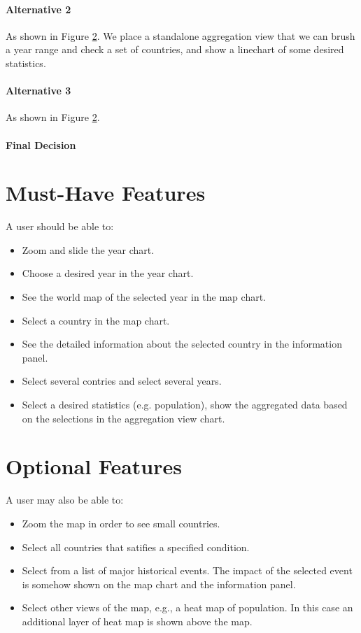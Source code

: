 \documentclass[12pt, fullpage,letterpaper]{article}
\begin{document}
\paragraph{Alternative 2}
As shown in Figure \ref{}.
We place a standalone aggregation view that we can brush a year range and check a set of countries, and
show a linechart of some desired statistics.

\paragraph{Alternative 3}
As shown in Figure \ref{}.

\paragraph{Final Decision}




\section{Must-Have Features}
A user should be able to:
\begin{itemize}
    \item Zoom and slide the year chart.
    \item Choose a desired year in the year chart. 
    \item See the world map of the selected year in the map chart.
    \item Select a country in the map chart.
    \item See the detailed information about the selected country in the information panel.
    \item Select several contries and select several years.
    \item Select a desired statistics (e.g. population), show the aggregated data based on the selections in the aggregation view chart.
\end{itemize}

\section{Optional Features}
A user may also be able to:
\begin{itemize}
    \item Zoom the map in order to see small countries.
    \item Select all countries that satifies a specified condition.
    \item Select from a list of major historical events. The impact of the selected event is somehow shown on the map chart and the information panel.
    \item Select other views of the map, e.g., a heat map of population. In this case an additional layer of heat map is shown above the map.
\end{itemize}
\end{document}
